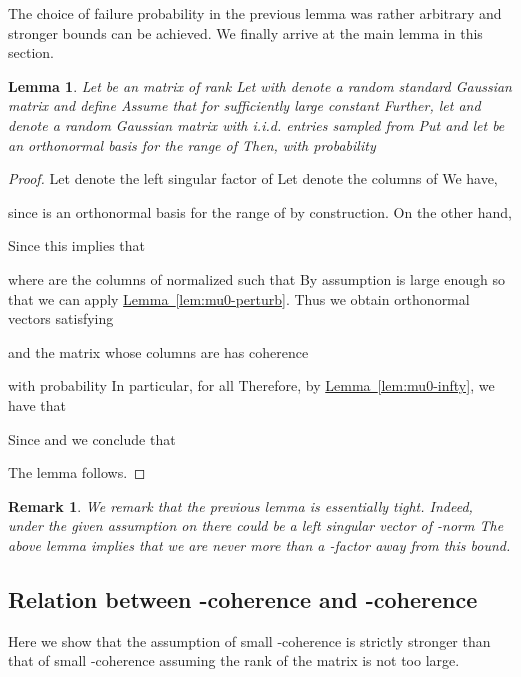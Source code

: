 \documentclass[letterpaper,11pt]{article}
\newtheorem{remark}[theorem]{Remark}
\newtheorem{lemma}[theorem]{Lemma}
\theoremstyle{definition}
\newcommand{\lemmalabel}[1]{\label{lem:#1}}
\newcommand{\lemmaref}[1]{\hyperref[lem:#1]{Lemma~\ref{lem:#1}}}
\newcommand{\sectionlabel}[1]{\label{sec:#1}}
\begin{document}
The choice of failure probability in the previous lemma was rather arbitrary
and stronger bounds can be achieved.
We finally arrive at the main lemma in this section.

\begin{lemma}\lemmalabel{mu0-projection}
Let  be an  matrix of rank 
Let  with 
denote a random standard Gaussian matrix and define 
Assume that  for sufficiently large constant 
Further, let  and
 denote a random Gaussian matrix with i.i.d.
entries sampled from  Put 
and let
 be an orthonormal basis for the range of 
Then, with probability 

\end{lemma}

\begin{proof}
Let  denote the left singular factor of  Let  denote the
columns of  We have,

since  is an orthonormal basis for the range of  by
construction. On the other hand,

Since  this implies that

where  are the columns of  normalized such that 
By assumption  is large enough so that we can apply \lemmaref{mu0-perturb}.
Thus we obtain orthonormal vectors  satisfying

and the matrix  whose columns are  has coherence

with probability  In particular,
 for all  Therefore,
by \lemmaref{mu0-infty}, we have that

Since  and  we conclude that

The lemma follows.
\end{proof}

\begin{remark}
We remark that the previous lemma is essentially tight. Indeed, under the
given assumption on  there could be a left singular vector of
-norm  The above lemma implies that
we are never more than a -factor away from this bound.
\end{remark}

\subsection{Relation between -coherence and -coherence}
\sectionlabel{relation}

Here we show that the assumption of small -coherence is strictly
stronger than that of small -coherence assuming the rank of the matrix is
not too large.
\end{document}
